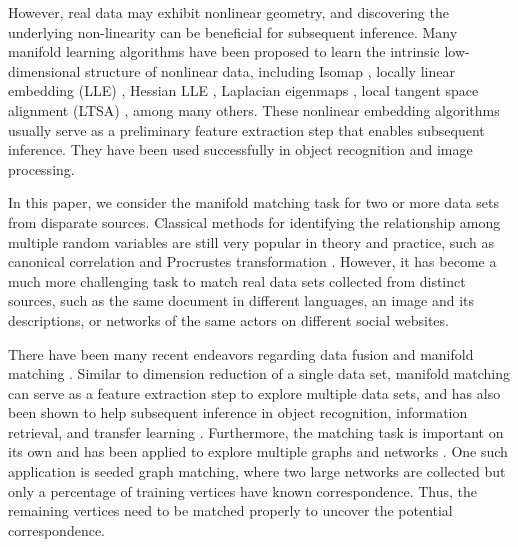 \documentclass[times,twocolumn,final]{elsarticle}
\begin{document}
However, real data may exhibit nonlinear geometry, and discovering the underlying non-linearity can be beneficial for subsequent inference. Many manifold learning algorithms have been proposed to learn the intrinsic low-dimensional structure of nonlinear data, including Isomap \citep{TenenbaumSilvaLangford2000, SilvaTenenbaum2003}, locally linear embedding (LLE) \citep{SaulRoweis2000, RoweisSaul2003}, Hessian LLE \citep{DonohoGrimes2003}, Laplacian eigenmaps \citep{BelkinNiyogi2003, HeEtAl2005}, local tangent space alignment (LTSA) \citep{ZhangZha2004, ZhangWangZha2012}, among many others. %
These nonlinear embedding algorithms usually serve as a preliminary feature extraction step that enables subsequent inference. They have been used successfully in object recognition and image processing. 

In this paper, we consider the manifold matching task for two or more data sets from disparate sources. Classical methods for identifying the relationship among multiple random variables are still very popular in theory and practice, such as canonical correlation \citep{Hotelling1936, Kettenring1971, Hardoon2004} and Procrustes transformation \citep{Sibson1978, Sibson1979, GoldbergRitov2009, GowerProcrustesBook}. However, it has become a much more challenging task to match real data sets collected from distinct sources, such as the same document in different languages, an image and its descriptions, or networks of the same actors on different social websites. 

There have been many recent endeavors regarding data fusion and manifold matching \citep{LafonKellerCoifman2006, WangMahadevan2008, WangMahadevan2012, SharmaKumar2012, PriebeMarchette2012}. Similar to dimension reduction of a single data set, manifold matching can serve as a feature extraction step to explore multiple data sets, and has also been shown to help subsequent inference in object recognition, information retrieval, and transfer learning \citep{KimKittlerCipolla2007, PanYang2010, SunPriebe2012, SunPriebeTang2013, ShenSunTangPriebe2014}. Furthermore, the matching task is important on its own and has been applied to explore multiple graphs and networks \citep{LyzinskiFishkindPriebe2014, JoshuaEtAl2015, LyzinskiFishkindPriebe2016}. One such application is seeded graph matching, where two large networks are collected but only a percentage of training vertices have known correspondence. Thus, the remaining vertices need to be matched properly to uncover the potential correspondence.
\end{document}
